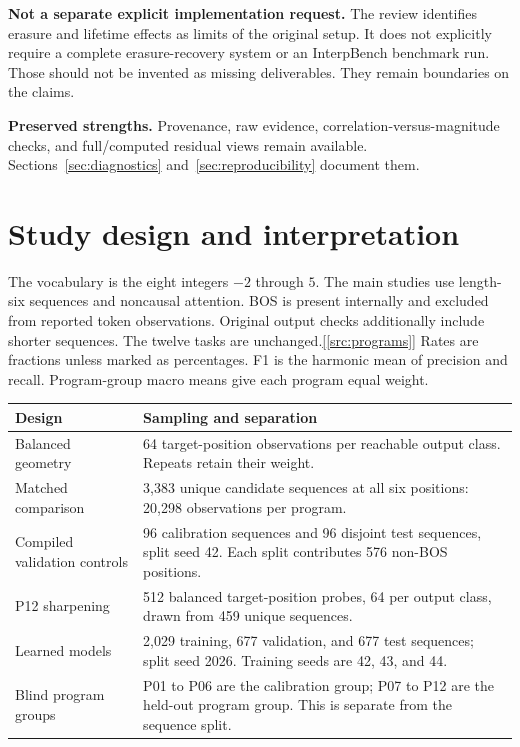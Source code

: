 \documentclass[10pt,a4paper]{article}
\newcommand{\newsection}[1]{\clearpage\section{#1}}
\newcommand{\ev}[1]{\hyperref[src:#1]{[\ref*{src:#1}]}}
\begin{document}
\textbf{Not a separate explicit implementation request.} The review identifies erasure and lifetime effects as limits of the original setup. It does not explicitly require a complete erasure-recovery system or an InterpBench benchmark run. Those should not be invented as missing deliverables. They remain boundaries on the claims.

\textbf{Preserved strengths.} Provenance, raw evidence, correlation-versus-magnitude checks, and full/computed residual views remain available. Sections~\ref{sec:diagnostics} and~\ref{sec:reproducibility} document them.

\newsection{Study design and interpretation}
\label{sec:methods}
The vocabulary is the eight integers $-2$ through $5$. The main studies use length-six sequences and noncausal attention. BOS is present internally and excluded from reported token observations. Original output checks additionally include shorter sequences. The twelve tasks are unchanged.\ev{programs}
Rates are fractions unless marked as percentages. F1 is the harmonic mean of precision and recall. Program-group macro means give each program equal weight.


\begin{center}\small
\begin{tabularx}{\linewidth}{@{}P{.29\linewidth}X@{}}
\toprule
Design & Sampling and separation\\
\midrule
Balanced geometry & 64 target-position observations per reachable output class. Repeats retain their weight.\\
Matched comparison & 3,383 unique candidate sequences at all six positions: 20,298 observations per program.\\
Compiled validation controls & 96 calibration sequences and 96 disjoint test sequences, split seed 42. Each split contributes 576 non-BOS positions.\\
P12 sharpening & 512 balanced target-position probes, 64 per output class, drawn from 459 unique sequences.\\
Learned models & 2,029 training, 677 validation, and 677 test sequences; split seed 2026. Training seeds are 42, 43, and 44.\\
Blind program groups & P01 to P06 are the calibration group; P07 to P12 are the held-out program group. This is separate from the sequence split.\\
\bottomrule
\end{tabularx}
\end{center}
\end{document}

